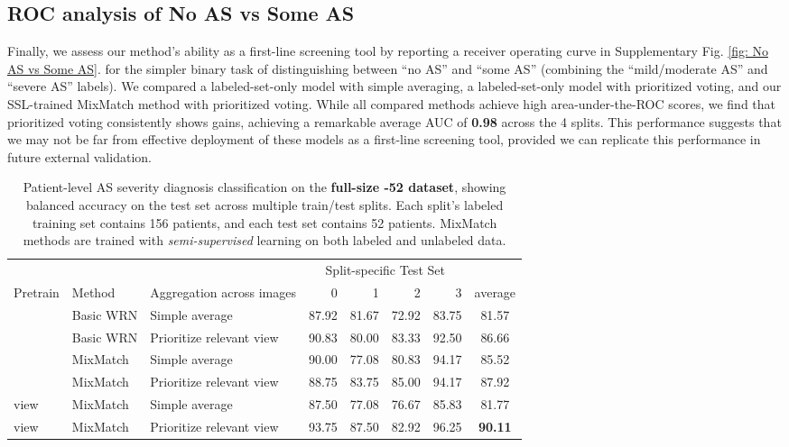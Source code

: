 \subsection{ROC analysis of No AS vs Some AS}
Finally, we assess our method's ability as a first-line screening tool by reporting a receiver operating curve in Supplementary Fig. \ref{fig: No AS vs Some AS}. for the simpler binary task of distinguishing between ``no AS'' and ``some AS'' (combining the ``mild/moderate AS'' and ``severe AS'' labels).
We compared a labeled-set-only model with simple averaging, a labeled-set-only model with prioritized voting, and our SSL-trained MixMatch method with prioritized voting.
While all compared methods achieve high area-under-the-ROC scores, we find that prioritized voting consistently shows gains, achieving a remarkable average AUC of \textbf{0.98} across the 4 splits.
This performance suggests that we may not be far from effective deployment of these models as a first-line screening tool, provided we can replicate this performance in future external validation.

\begin{table}[!t]
    \centering
    \begin{tabular}{l l l|rrrr|c}
	         &        & & \multicolumn{4}{c}{Split-specific Test Set} \\
    Pretrain & Method & Aggregation across images
    & 0  & 1 & 2 & 3 & average\\
    \hline
    & Basic WRN & Simple average & 87.92 & 81.67 & 72.92 & 83.75 & 81.57\\
    & Basic WRN & Prioritize relevant view & 90.83 & 80.00 & 83.33 & 92.50 & 86.66\\
    \hline
    & MixMatch & Simple average & 90.00 & 77.08 & 80.83 & 94.17 & 85.52\\
    & MixMatch & Prioritize relevant view & 88.75 & 83.75 & 85.00 & 94.17 & 87.92\\
    view & MixMatch & Simple average & 87.50 & 77.08 & 76.67 & 85.83 & 81.77\\
    view & MixMatch & Prioritize relevant view  & 93.75 & 87.50 & 82.92 & 96.25 & \textbf{90.11}\\
    \end{tabular}
    \caption{Patient-level AS severity diagnosis classification on the \textbf{full-size -52 dataset}, showing balanced accuracy on the test set across multiple train/test splits. Each split's labeled training set contains 156 patients, and each test set contains 52 patients.
    MixMatch methods are trained with \emph{semi-supervised} learning on both labeled and unlabeled data. 
    }%
    \label{tab:diagnosis classification large patient}
\end{table}

